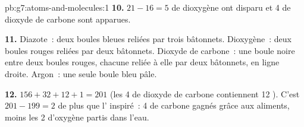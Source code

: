 \begin{solution}{pb:g7:atoms-and-molecules:1}
\textbf{10.} $21 - 16 = 5$  de dioxygène ont disparu et 4
 de dioxyde de carbone sont apparues.

\textbf{11.} Diazote~: deux boules bleues reliées par trois bâtonnets.
Dioxygène~: deux boules rouges reliées par deux bâtonnets. Dioxyde de
carbone~: une boule noire entre deux boules rouges, chacune reliée à
elle par deux bâtonnets, en ligne droite. Argon~: une seule boule bleu
pâle.

\textbf{12.} $156 + 32 + 12 + 1 = 201$  (les 4  de
dioxyde de carbone contiennent 12 ). C'est $201 - 199 = 2$ 
de plus que l' inspiré~: 4  de carbone gagnés grâce aux
aliments, moins les 2  d'oxygène partis dans l'eau.
\end{solution}
